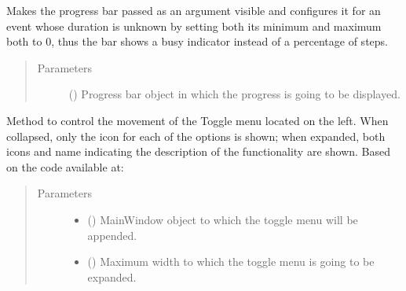 \documentclass[letterpaper,10pt,english]{sphinxmanual}
\begin{document}
\begin{fulllineitems}
\label{\detokenize{gui_util:src.graphical_user_interface.util.signal_accept}}
\sphinxAtStartPar
Makes the progress bar passed as an argument visible and configures it for
an event whose duration is unknown by setting both its minimum and maximum
both to 0, thus the bar shows a busy indicator instead of a percentage of steps.
\begin{quote}\begin{description}
\item[{Parameters}] \leavevmode
\sphinxAtStartPar
{} () \textendash{} Progress bar object in which the progress is going to be displayed.

\end{description}\end{quote}

\end{fulllineitems}


\begin{fulllineitems}
\label{\detokenize{gui_util:src.graphical_user_interface.util.toggle_menu}}
\sphinxAtStartPar
Method to control the movement of the Toggle menu located on the
left. When collapsed, only the icon for each of the options is shown;
when expanded, both icons and name indicating the description of the
functionality are shown.
Based on the code available at:
\begin{quote}\begin{description}
\item[{Parameters}] \leavevmode\begin{itemize}
\item {} 
\sphinxAtStartPar
{} () \textendash{} MainWindow object to which the toggle menu will be appended.

\item {} 
\sphinxAtStartPar
{} () \textendash{} Maximum width to which the toggle menu is going to be expanded.

\end{itemize}

\end{description}\end{quote}

\end{fulllineitems}
\end{document}
